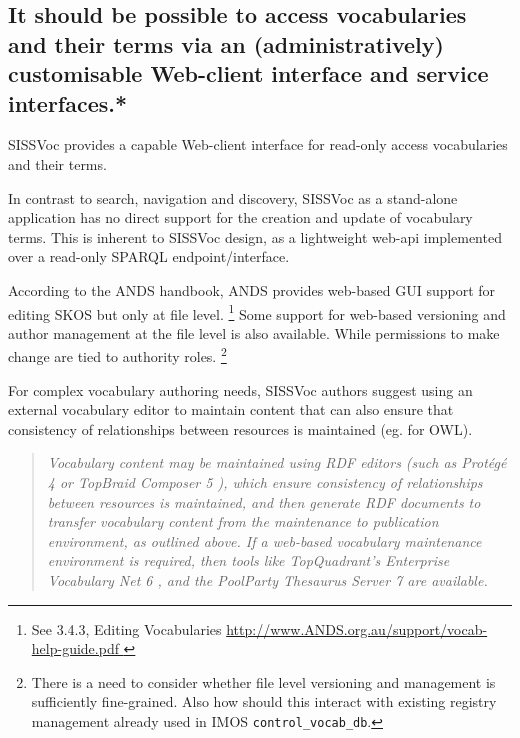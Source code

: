 \documentclass[10pt,a4paper]{article}
\newenvironment{italicquotes}
{\begin{quote}\itshape}
{\end{quote}}
\begin{document}
\begin{flushleft}
  \subsection{
  It should be possible to access vocabularies and their terms via an 
  (administratively) customisable Web-client interface and service interfaces.* } 

   \item  SISSVoc provides a capable Web-client interface for read-only access
  vocabularies and their terms.

   \item  In contrast to search, navigation and discovery, SISSVoc as a stand-alone
  application has no direct support for the creation and update of vocabulary
  terms. This is inherent to SISSVoc design, as a lightweight web-api implemented
  over a read-only SPARQL endpoint/interface.  

 \item    According to the ANDS handbook, ANDS provides web-based GUI support for
  editing SKOS but only at file level.  \footnote { See 3.4.3, Editing
  Vocabularies \url{ http://www.ANDS.org.au/support/vocab-help-guide.pdf } } Some 
  support for web-based versioning and author management at the file level
  is also available. While permissions to make change are tied to authority 
  roles.  \footnote { There is a need to consider whether file level versioning and
  management is sufficiently fine-grained. Also how should this interact with
  existing registry management already used in IMOS \texttt{control\_vocab\_db}.
  }
    
 \item    For complex vocabulary authoring needs, SISSVoc authors suggest using an
  external vocabulary editor to maintain content that can also ensure that
  consistency of relationships between resources is maintained (eg. for OWL). 

    \begin{italicquotes} Vocabulary content may be maintained using RDF editors
  (such as Protégé 4 or TopBraid Composer 5 ), which ensure consistency of
  relationships between resources is maintained, and then generate RDF documents
  to transfer vocabulary content from the maintenance to publication environment, 
  as outlined above. If a web-based vocabulary maintenance environment
  is required, then tools like TopQuadrant’s Enterprise Vocabulary Net 6 , and
  the PoolParty Thesaurus Server 7 are available.  \end{italicquotes} 


\end{flushleft}
\end{document}
